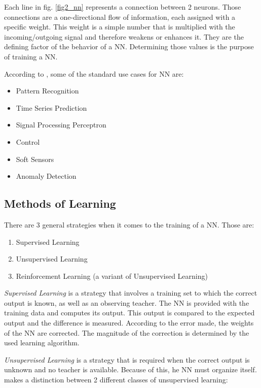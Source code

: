 Each line in fig. \ref{fig2_nn} represents a connection between 2 neurons. Those connections are a one-directional flow of information, each assigned with a specific weight. This weight is a simple number that is multiplied with the incoming/outgoing signal and therefore weakens or enhances it. They are the defining factor of the behavior of a NN. Determining those values is the purpose of training a NN\cite{Bourg04}.

According to \cite{Shiffman12}, some of the standard use cases for NN are:

\begin{itemize}
	\item Pattern Recognition
	\item Time Series Prediction
	\item Signal Processing Perceptron
	\item Control
	\item Soft Sensors
	\item Anomaly Detection
\end{itemize}


\subsection{Methods of Learning}
\label{sec2_learning}
There are 3 general strategies when it comes to the training of a NN\cite{Bourg04}. Those are:

\begin{enumerate}
	\item Supervised Learning
	\item Unsupervised Learning
	\item Reinforcement Learning (a variant of Unsupervised Learning\cite{Rojas96})
\end{enumerate}

\emph{Supervised Learning} is a strategy that involves a training set to which the correct output is known, as well as an observing teacher. The NN is provided with the training data and computes its output. This output is compared to the expected output and the difference is measured. According to the error made, the weights of the NN are corrected. The magnitude of the correction is determined by the used learning algorithm\cite{Rojas96}.

\emph{Unsupervised Learning} is a strategy that is required when the correct output is unknown and no teacher is available. Because of this, he NN must organize itself\cite{Shiffman12}. \cite{Rojas96} makes a distinction between 2 different classes of unsupervised learning:

